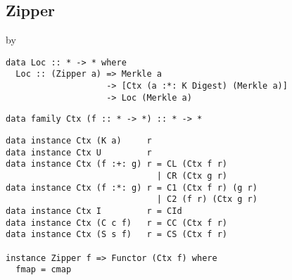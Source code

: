\subsection{Zipper}

 by \citeauthor{bransen2013generic}\cite{bransen2013generic}

\begin{verbatim}
data Loc :: * -> * where
  Loc :: (Zipper a) => Merkle a 
                    -> [Ctx (a :*: K Digest) (Merkle a)] 
                    -> Loc (Merkle a) 
\end{verbatim}

\begin{verbatim}
data family Ctx (f :: * -> *) :: * -> *
\end{verbatim}

\begin{verbatim}
data instance Ctx (K a)     r
data instance Ctx U         r
data instance Ctx (f :+: g) r = CL (Ctx f r)
                              | CR (Ctx g r)
data instance Ctx (f :*: g) r = C1 (Ctx f r) (g r)
                              | C2 (f r) (Ctx g r)
data instance Ctx I         r = CId
data instance Ctx (C c f)   r = CC (Ctx f r)
data instance Ctx (S s f)   r = CS (Ctx f r)

instance Zipper f => Functor (Ctx f) where
  fmap = cmap
\end{verbatim}